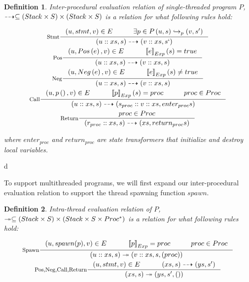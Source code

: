 \documentclass[..thesis.tex]{subfiles}
\newtheorem{defin}{Definition}[section]
\begin{document}
\begin{defin}

Inter-procedural evaluation relation of single-threaded program $P$, $\dashrightarrow \subseteq \left( Stack \times S \right) \times \left( Stack \times S \right)$ is a relation for what following rules hold:

\addtolength{\jot}{2em}
\begin{gather*}
  \inference[Stmt]{\lp u, stmt, v \rp \in E  \separ \exists p \in P  \lp u, s \rp \intraproc_p \lp v, s' \rp }{ \lp u :: xs, s \rp \interproc \lp v :: xs, s` \rp} \\
  \inference[Pos]{ \lp u, Pos \lp e \rp, v \rp \in E \separ   \lllb e \rrrb_{Exp} \lp s \rp = true  }{\lp u :: xs , s \rp \interproc \lp v :: xs, s \rp} \\ 
  \inference[Neg]{ \lp u, Neg \lp e \rp, v \rp  \in E \separ   \lllb e \rrrb_{Exp} \lp s \rp \neq true  }{\lp u :: xs , s \rp \interproc \lp v :: xs, s \rp} \\
  \inference[Call]{ \lp u, p\lp\rp , v \rp  \in E \separ  \lllb p \rrrb_{Exp} \lp s \rp = proc \separ proc \in Proc }{\lp u :: xs , s \rp \interproc \lp s_{proc} :: v :: xs, enter_{proc} s \rp} \\
  \inference[Return] { proc \in Proc} { \lp r_{proc}::xs , s \rp \interproc \lp xs, return_{proc} s \rp}
\end{gather*}
\addtolength{\jot}{-2em}

where $enter_{proc}$ and $return_{proc}$ are state transformers that initialize and destroy local variables.

\end{defin}d 


To support multithreaded programs, we will first expand our inter-procedural evaluation relation to support the thread spawning function $spawn$.

\begin{defin}

Intra-thread evaluation relation of $P$, $\twoheadrightarrow \subseteq  \left( Stack \times S \right) \times \left( Stack \times S \times Proc^\ast \right)$ is a relation for what following rules hold:

\addtolength{\jot}{2em}
\begin{gather*}
  \inference[Spawn]{\lp u, spawn(p), v \rp \in E  \separ  \lllb p \rrrb_{Exp} = proc \separ proc \in Proc  }{ \lp u :: xs, s \rp \intrathread \lp v :: xs, s, (proc) \rp} \\
  \inference[Pos,Neg,Call,Return] {\lp u, stmt, v \rp \in E \separ \lp xs , s \rp \interproc \lp ys, s' \rp }{ \lp xs , s \rp \intrathread \lp ys, s', \lp \rp \rp}
\end{gather*}
\addtolength{\jot}{-2em}

\end{defin}
\end{document}
